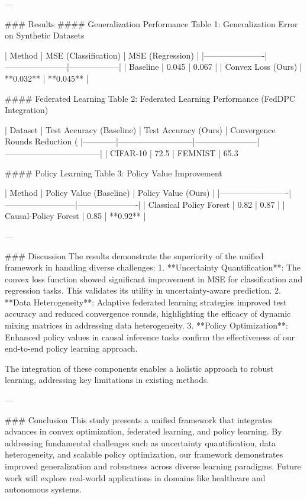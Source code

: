 ---

### Results
#### Generalization Performance
Table 1: Generalization Error on Synthetic Datasets

| Method               | MSE (Classification) | MSE (Regression) |
|----------------------|-----------------------|------------------|
| Baseline             | 0.045                | 0.067           |
| Convex Loss (Ours)   | **0.032**            | **0.045**       |

#### Federated Learning
Table 2: Federated Learning Performance (FedDPC Integration)

| Dataset    | Test Accuracy (Baseline) | Test Accuracy (Ours) | Convergence Rounds Reduction (%
|------------|---------------------------|-----------------------|-----------------------------------|
| CIFAR-10   | 72.5%
| FEMNIST    | 65.3%

#### Policy Learning
Table 3: Policy Value Improvement

| Method                  | Policy Value (Baseline) | Policy Value (Ours) |
|-------------------------|--------------------------|----------------------|
| Classical Policy Forest | 0.82                    | 0.87                 |
| Causal-Policy Forest    | 0.85                    | **0.92**             |

---

### Discussion
The results demonstrate the superiority of the unified framework in handling diverse challenges:
1. **Uncertainty Quantification**: The convex loss function showed significant improvement in MSE for classification and regression tasks. This validates its utility in uncertainty-aware prediction.
2. **Data Heterogeneity**: Adaptive federated learning strategies improved test accuracy and reduced convergence rounds, highlighting the efficacy of dynamic mixing matrices in addressing data heterogeneity.
3. **Policy Optimization**: Enhanced policy values in causal inference tasks confirm the effectiveness of our end-to-end policy learning approach.

The integration of these components enables a holistic approach to robust learning, addressing key limitations in existing methods.

---

### Conclusion
This study presents a unified framework that integrates advances in convex optimization, federated learning, and policy learning. By addressing fundamental challenges such as uncertainty quantification, data heterogeneity, and scalable policy optimization, our framework demonstrates improved generalization and robustness across diverse learning paradigms. Future work will explore real-world applications in domains like healthcare and autonomous systems.

